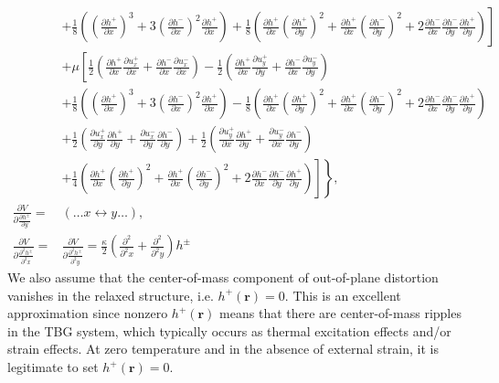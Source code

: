 \documentclass[aps,prx,10pt,twocolumn,superscriptaddress]{revtex4}
\begin{document}
\begin{widetext}
\begin{align}
&\left.+\frac{1}{8}\left(\left( \frac{\partial h^{+}}{\partial x} \right)^{3}+3\left(\frac{\partial h^{-}}{\partial x}\right)^{2}\frac{\partial h^{+}}{\partial x}\right)+\frac{1}{8}\left( \frac{\partial h^{+}}{\partial x}\left(\frac{\partial h^{+}}{\partial y}\right)^{2}+\frac{\partial h^{+}}{\partial x}\left(\frac{\partial h^{-}}{\partial y}\right)^{2}+2\frac{\partial h^{-}}{\partial x}\frac{\partial h^{-}}{\partial y}\frac{\partial h^{+}}{\partial y} \right)\right]\nonumber\\
&+ \mu\left[ \frac{1}{2}\left( \frac{\partial h^{+}}{\partial x}\frac{\partial u^{+}_{x}}{\partial x}+\frac{\partial h^{-}}{\partial x}\frac{\partial u^{-}_{x}}{\partial x} \right) -\frac{1}{2}\left( \frac{\partial h^{+}}{\partial x}\frac{\partial u^{+}_{y}}{\partial y}+\frac{\partial h^{-}}{\partial x}\frac{\partial u^{-}_{y}}{\partial y} \right)  \right.\nonumber\\
&+\frac{1}{8}\left(\left( \frac{\partial h^{+}}{\partial x} \right)^{3}+3\left(\frac{\partial h^{-}}{\partial x}\right)^{2}\frac{\partial h^{+}}{\partial x}\right)-\frac{1}{8}\left( \frac{\partial h^{+}}{\partial x}\left(\frac{\partial h^{+}}{\partial y}\right)^{2}+\frac{\partial h^{+}}{\partial x}\left(\frac{\partial h^{-}}{\partial y}\right)^{2}+2\frac{\partial h^{-}}{\partial x}\frac{\partial h^{-}}{\partial y}\frac{\partial h^{+}}{\partial y} \right)\nonumber\\
&+\frac{1}{2}\left( \frac{\partial u^{+}_{x}}{\partial y}\frac{\partial h^{+}}{\partial y}+\frac{\partial u^{-}_{x}}{\partial y}\frac{\partial h^{-}}{\partial y} \right)+\frac{1}{2}\left( \frac{\partial u^{+}_{y}}{\partial x}\frac{\partial h^{+}}{\partial y}+\frac{\partial u^{-}_{y}}{\partial x}\frac{\partial h^{-}}{\partial y} \right)\nonumber\\
&\left.\left.+\frac{1}{4}\left(\frac{\partial h^{+}}{\partial x}\left(\frac{\partial h^{+}}{\partial y}\right)^{2}+\frac{\partial h^{+}}{\partial x}\left(\frac{\partial h^{-}}{\partial y}\right)^{2}+2\frac{\partial h^{-}}{\partial x}\frac{\partial h^{-}}{\partial y}\frac{\partial h^{+}}{\partial y}\right)\right]\right\},\nonumber\\
\frac{\partial V}{\partial \frac{\partial h^{\pm}}{\partial y}}=&(\dots x\leftrightarrow y\dots),\nonumber\\
\frac{\partial V}{\partial \frac{\partial^{2} h^{\pm}}{\partial^{2} x}}=&\frac{\partial V}{\partial \frac{\partial^{2} h^{\pm}}{\partial^{2} y}}=\frac{\kappa}{2}\left(\frac{\partial^{2}}{\partial^{2}x}+\frac{\partial^{2}}{\partial^{2}y}\right)h^{\pm}
\end{align}
We also assume that the center-of-mass component of out-of-plane distortion vanishes in the relaxed structure, i.e. $h^{+}(\textbf{r})=0$. This is an excellent approximation since nonzero $h^{+}(\textbf{r})$ means that there are center-of-mass ripples in the TBG system, which typically occurs as  thermal excitation effects and/or strain effects. At zero temperature and in the absence of external strain, it is legitimate to set $h^{+}(\textbf{r})=0$. 



\end{widetext}
\end{document}
